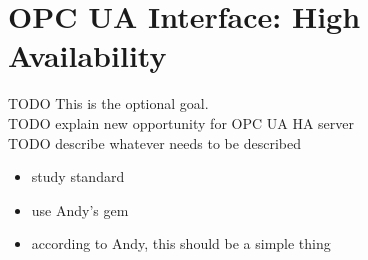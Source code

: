\section{OPC UA Interface: High Availability}\label{sec:meth:opc-ua}
TODO This is the optional goal.\\
TODO explain new opportunity for OPC UA HA server\\
TODO describe whatever needs to be described\\

\begin{itemize}
	\item study standard
	\item use Andy's gem
	\item according to Andy, this should be a simple thing
\end{itemize}
